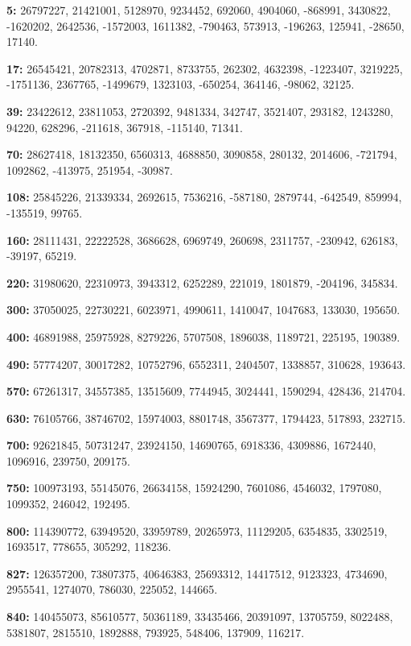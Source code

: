 \begingroup\small
\noindent\textbf{5:}
26797227, 21421001, 5128970, 9234452, 692060, 4904060, -868991,
3430822, -1620202, 2642536, -1572003, 1611382, -790463, 573913,
-196263, 125941, -28650, 17140.\par\smallskip
\noindent\textbf{17:}
26545421, 20782313, 4702871, 8733755, 262302, 4632398, -1223407,
3219225, -1751136, 2367765, -1499679, 1323103, -650254, 364146,
-98062, 32125.\par\smallskip
\noindent\textbf{39:}
23422612, 23811053, 2720392, 9481334, 342747, 3521407, 293182,
1243280, 94220, 628296, -211618, 367918, -115140, 71341.\par\smallskip
\noindent\textbf{70:}
28627418, 18132350, 6560313, 4688850, 3090858, 280132, 2014606,
-721794, 1092862, -413975, 251954, -30987.\par\smallskip
\noindent\textbf{108:}
25845226, 21339334, 2692615, 7536216, -587180, 2879744, -642549,
859994, -135519, 99765.\par\smallskip
\noindent\textbf{160:}
28111431, 22222528, 3686628, 6969749, 260698, 2311757, -230942,
626183, -39197, 65219.\par\smallskip
\noindent\textbf{220:}
31980620, 22310973, 3943312, 6252289, 221019, 1801879, -204196,
345834.\par\smallskip
\noindent\textbf{300:}
37050025, 22730221, 6023971, 4990611, 1410047, 1047683, 133030,
195650.\par\smallskip
\noindent\textbf{400:}
46891988, 25975928, 8279226, 5707508, 1896038, 1189721, 225195,
190389.\par\smallskip
\noindent\textbf{490:}
57774207, 30017282, 10752796, 6552311, 2404507, 1338857, 310628,
193643.\par\smallskip
\noindent\textbf{570:}
67261317, 34557385, 13515609, 7744945, 3024441, 1590294, 428436,
214704.\par\smallskip
\noindent\textbf{630:}
76105766, 38746702, 15974003, 8801748, 3567377, 1794423, 517893,
232715.\par\smallskip
\noindent\textbf{700:}
92621845, 50731247, 23924150, 14690765, 6918336, 4309886, 1672440,
1096916, 239750, 209175.\par\smallskip
\noindent\textbf{750:}
100973193, 55145076, 26634158, 15924290, 7601086, 4546032, 1797080,
1099352, 246042, 192495.\par\smallskip
\noindent\textbf{800:}
114390772, 63949520, 33959789, 20265973, 11129205, 6354835, 3302519,
1693517, 778655, 305292, 118236.\par\smallskip
\noindent\textbf{827:}
126357200, 73807375, 40646383, 25693312, 14417512, 9123323, 4734690,
2955541, 1274070, 786030, 225052, 144665.\par\smallskip
\noindent\textbf{840:}
140455073, 85610577, 50361189, 33435466, 20391097, 13705759, 8022488,
5381807, 2815510, 1892888, 793925, 548406, 137909, 116217.\par
\endgroup

